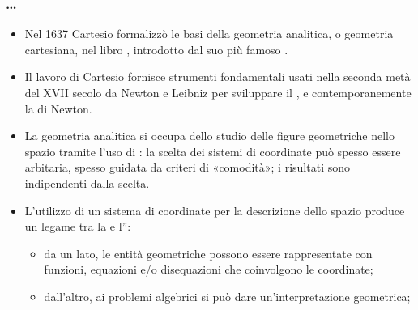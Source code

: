 \documentclass[letterpaper,10pt,italian]{jupyterBook}
\begin{document}
\subsubsection*{…}
\begin{itemize}
\item {} 
\sphinxAtStartPar
Nel 1637 Cartesio formalizzò le basi della geometria analitica, o geometria cartesiana, nel libro , introdotto dal suo più famoso .

\item {} 
\sphinxAtStartPar
Il lavoro di Cartesio fornisce strumenti fondamentali usati nella seconda metà del XVII secolo da Newton e Leibniz per sviluppare il {\hyperref[\detokenize{ch/calculus:math-hs-calculus}]{}}, e contemporanemente la  di Newton.

\item {} 
\sphinxAtStartPar
La geometria analitica si occupa dello studio delle figure geometriche nello spazio tramite l’uso di : la scelta dei sistemi di coordinate può spesso essere arbitaria, spesso guidata da criteri di «comodità»; i risultati sono indipendenti dalla scelta.

\item {} 
\sphinxAtStartPar
L’utilizzo di un sistema di coordinate per la descrizione dello spazio produce un legame tra la  e l”:
\begin{itemize}
\item {} 
\sphinxAtStartPar
da un lato, le entità geometriche possono essere rappresentate con funzioni, equazioni e/o disequazioni che coinvolgono le coordinate;

\item {} 
\sphinxAtStartPar
dall’altro, ai problemi algebrici si può dare un’interpretazione geometrica;

\end{itemize}

\end{itemize}







\sphinxstepscope
\end{document}
